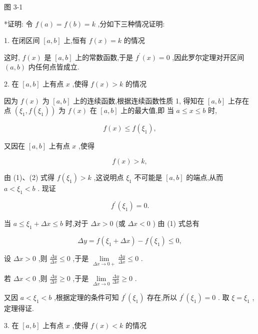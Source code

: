 \documentclass[10pt]{article}
\begin{document}
图 3-1

*证明: 令 \(f\left( a\right) = f\left( b\right) = k\) ,分如下三种情况证明:

1. 在闭区间 \(\left\lbrack {a,b}\right\rbrack\) 上,恒有 \(f\left( x\right) = k\) 的情况

这时, \(f\left( x\right)\) 是 \(\left\lbrack {a,b}\right\rbrack\) 上的常数函数,于是 \({f}^{\prime }\left( x\right) = 0\) ,因此罗尔定理对开区间 \(\left( {a,b}\right)\) 内任何点皆成立.

2. 在 \(\left\lbrack {a,b}\right\rbrack\) 上有点 \(x\) ,使得 \(f\left( x\right) > k\) 的情况

因为 \(f\left( x\right)\) 为 \(\left\lbrack {a,b}\right\rbrack\) 上的连续函数,根据连续函数性质 1, 得知在 \(\left\lbrack {a,b}\right\rbrack\) 上存在点 \(\left( {{\xi }_{1},f\left( {\xi }_{1}\right) }\right)\) 为 \(f\left( x\right)\) 在 \(\left\lbrack {a,b}\right\rbrack\) 上的最大值,即 当 \(a \leq x \leq b\) 时,

\[
f\left( x\right) \leq f\left( {\xi }_{1}\right) , \tag{1}
\]

又因在 \(\left\lbrack {a,b}\right\rbrack\) 上有点 \(x\) ,使得

\[
f\left( x\right) > k, \tag{2}
\]

由 (1)、(2) 式得 \(f\left( {\xi }_{1}\right) > k\) ,这说明点 \({\xi }_{1}\) 不可能是 \(\left\lbrack {a,b}\right\rbrack\) 的端点,从而 \(a < {\xi }_{1} < b\) . 现证

\[
{f}^{\prime }\left( {\xi }_{1}\right) = 0\text{.}
\]

当 \(a \leq {\xi }_{1} + {\Delta x} \leq b\) 时,对于 \({\Delta x} > 0\) (或 \({\Delta x} < 0\) ) 由 (1) 式总有

\[
{\Delta y} = f\left( {{\xi }_{1} + {\Delta x}}\right) - f\left( {\xi }_{1}\right) \leq 0,
\]

设 \({\Delta x} > 0\) ,则 \(\frac{\Delta y}{\Delta x} \leq 0\) ,于是 \(\mathop{\lim }\limits_{{{\Delta x} \rightarrow 0 + }}\frac{\Delta y}{\Delta x} \leq 0\) .

若 \({\Delta x} < 0\) ,则 \(\frac{\Delta y}{\Delta x} \geq 0\) ,于是 \(\mathop{\lim }\limits_{{{\Delta x} \rightarrow 0}}\frac{\Delta y}{\Delta x} \geq 0\) .

又因 \(a < {\xi }_{1} < b\) ,根据定理的条件可知 \({f}^{\prime }\left( {\xi }_{1}\right)\) 存在,所以 \({f}^{\prime }\left( {\xi }_{1}\right) = 0\) . 取 \(\xi = {\xi }_{1}\) ,定理得证.

3. 在 \(\left\lbrack {a,b}\right\rbrack\) 上有点 \(x\) ,使得 \(f\left( x\right) < k\) 的情况
\end{document}
